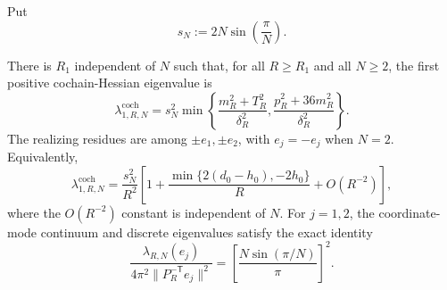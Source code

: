 Put
\begin{equation}\label{eq:s6cusp-discrete-sN}
 s_N:=2N\sin\left(\frac{\pi}{N}\right).
\end{equation}

\begin{theorem}
\label{thm:s6cusp-sharp-discrete-cusp-scale}
There is \(R_1\) independent of \(N\) such that, for all \(R\ge R_1\) and
all \(N\ge2\), the first positive cochain-Hessian eigenvalue is
\begin{equation}\label{eq:s6cusp-first-discrete-exact}
 \lambda_{1,R,N}^{\mathrm{coch}}
 =s_N^2\min\left\{
 \frac{m_R^2+T_R^2}{\delta_R^2},
 \frac{p_R^2+36m_R^2}{\delta_R^2}
 \right\}.
\end{equation}
The realizing residues are among
\(\pm e_1,\pm e_2\), with \(e_j=-e_j\) when \(N=2\).  Equivalently,
\begin{equation}\label{eq:s6cusp-first-discrete-expansion}
 \lambda_{1,R,N}^{\mathrm{coch}}
 =\frac{s_N^2}{R^2}
 \left[
 1+\frac{\min\{2(d_0-h_0),-2h_0\}}{R}
 +O(R^{-2})
 \right],
\end{equation}
where the \(O(R^{-2})\) constant is independent of \(N\).  For
\(j=1,2\), the coordinate-mode continuum and discrete eigenvalues satisfy
the exact identity
\begin{equation}\label{eq:s6cusp-continuum-discrete-ratio}
 \frac{\lambda_{R,N}(e_j)}
 {4\pi^2\lVert P_R^{-\mathsf T}e_j\rVert^2}
 =
 \left[
 \frac{N\sin(\pi/N)}{\pi}
 \right]^2.
\end{equation}
\end{theorem}

